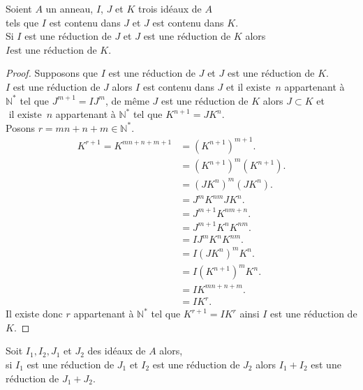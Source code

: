\begin{maproposition}
	Soient $A$ un anneau, $I$, $J$ et $K$ trois id\'eaux de $A$ \\ tels que 
	$I $ est contenu dans $ J $ et $J$ est contenu dans $ K $.\\ Si $I$ est une réduction de $J$ et $J$ est une réduction de $K$ alors $ I \text{est une réduction de }  K $.
\end{maproposition}
\begin{proof}
	Supposons que $I$ est une réduction de $J$ et $J$ est une réduction de $K$.\\
	$I$ est une réduction de $J$ alors $I $ est contenu dans $ J$ et $\text{il existe } \, n$ appartenant à $ \mathbb{N}^{*}$ tel que $J^{m+1} = IJ^{m}$, de même $J$ est une réduction de $K$ alors $J \subset K$ et $\text{ il existe } \, n$ appartenant à $ \mathbb{N}^{*}$ tel que $K^{n+1} = JK^{n}$.\\
	Posons $r = mn+n+m \in \mathbb{N}^{*}$.
	\begin{align*}
		K^{r+1} = K^{mn+n+m+1}& = (K^{n+1})^{m+1}.\\
		 & = (K^{n+1})^{m}(K^{n+1}).\\
		 & = (JK^{n})^{m}(JK^{n}).\\
		 & = J^{m}K^{nm}JK^{n}.\\
		 & = J^{m+1}K^{nm+n}.\\
		 & = J^{m+1}K^{n}K^{nm}.\\
		 & = IJ^{m}K^{n}K^{nm}.\\
		 & = I(JK^{n})^{m}K^{n}.\\
		 & = I(K^{n+1})^{m}K^{n}.\\
		 & = IK^{mn+n+m}.\\
		 & = IK^r.          
	\end{align*}
	Il existe donc $r $ appartenant à $ \mathbb{N}^{*}$ tel que $K^{r+1} = IK^{r}$ ainsi $I$ est une réduction de $K$.
\end{proof}
\begin{monlemme}
	Soit $I_1, I_2, J_1$ et $J_2$ des idéaux de $A$ alors, \\ si $I_1$ est  une réduction de $J_1$ et $I_2$ est une réduction de $J_2$ alors $I_1+I_2$ est une réduction de $J_1+J_2$.
\end{monlemme}
